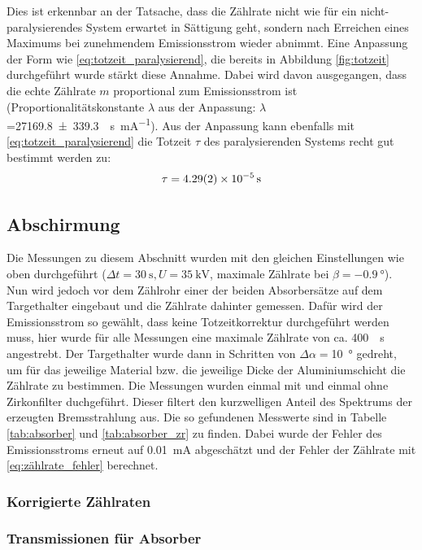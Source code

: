 \documentclass[11pt, a4paper]{article}
\numberwithin{equation}{section}
\begin{document}
Dies ist erkennbar an der Tatsache, dass die Zählrate nicht wie für ein nicht-paralysierendes System erwartet in Sättigung geht, sondern nach Erreichen eines Maximums bei zunehmendem Emissionsstrom wieder abnimmt.
Eine Anpassung der Form wie \eqref{eq:totzeit_paralysierend}, die bereits in Abbildung \ref{fig:totzeit} durchgeführt wurde stärkt diese Annahme.
Dabei wird davon ausgegangen, dass die echte Zählrate $m$ proportional zum Emissionsstrom ist (Proportionalitätskonstante $\lambda$ aus der Anpassung: $\lambda$=\SI{27169.8+-339.3}{\per\second\per\milli\ampere}).
Aus der Anpassung kann ebenfalls mit \eqref{eq:totzeit_paralysierend} die Totzeit $\tau$ des paralysierenden Systems recht gut bestimmt werden zu:
\begin{align}
\tau = \SI{4.29 +- 0.02e-5}{\second}
\end{align}

\subsection{Abschirmung}

Die Messungen zu diesem Abschnitt wurden mit den gleichen Einstellungen wie oben durchgeführt ($\Delta t=\SI{30}{\second}, U=\SI{35}{\kilo\volt}$, maximale Zählrate bei $\beta=\SI{-0.9}{\degree}$).
Nun wird jedoch vor dem Zählrohr einer der beiden Absorbersätze auf dem Targethalter eingebaut und die Zählrate dahinter gemessen.
Dafür wird der Emissionsstrom so gewählt, dass keine Totzeitkorrektur durchgeführt werden muss, hier wurde für alle Messungen eine maximale Zählrate von ca. \SI{400}{\per\second} angestrebt.
Der Targethalter wurde dann in Schritten von $\Delta\alpha=$\SI{10}{\degree} gedreht, um für das jeweilige Material bzw. die jeweilige Dicke der Aluminiumschicht die Zählrate zu bestimmen.
Die Messungen wurden einmal mit und einmal ohne Zirkonfilter duchgeführt.
Dieser filtert den kurzwelligen Anteil des Spektrums der erzeugten Bremsstrahlung aus.
Die so gefundenen Messwerte sind in Tabelle \ref{tab:absorber} und \ref{tab:absorber_zr} zu finden.
Dabei wurde der Fehler des Emissionsstroms erneut auf \SI{0.01}{\milli\ampere} abgeschätzt und der Fehler der Zählrate mit \eqref{eq:zählrate_fehler} berechnet.

\subsubsection{Korrigierte Zählraten}

\subsubsection{Transmissionen für Absorber}
\end{document}
